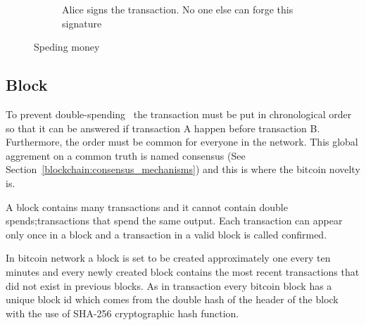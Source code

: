 \begin{figure}[ht!]
\begin{subfigure}[t]{0.50\textwidth}
    \caption{Alice signs the transaction. No one else can forge this signature}
    \label{fig:bl_spent:d}
  \end{subfigure}
  \caption{Speding money}
  \label{fig:bl_spent}
\end{figure}

\subsection{Block}\label{blockchain:structure:block}

To prevent double-spending~\cite{wiki:double_spend,bitcoin_wiki:double_spend} the transaction must be put in chronological order so that it can be answered
if transaction A happen before transaction B. Furthermore, the order must be common for everyone in the network.
This global aggrement on a common truth is named consensus (See Section~\ref{blockchain:consensus_mechanisms}) and this is where the bitcoin novelty is.

A block contains many transactions and it cannot contain double spends;transactions that spend the same output.
Each transaction can appear only once in a block and a transaction in a valid block is called confirmed.

In bitcoin network a block is set to be created approximately one every ten minutes and every newly created block contains the most recent transactions that did not
exist in previous blocks. As in transaction every bitcoin block has a unique block id which comes from the double hash of the header of the block with the use of SHA-256 cryptographic hash function.

